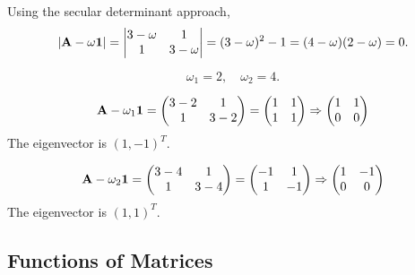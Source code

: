 \documentclass[a4paper]{book}
\newcounter{solution}[chapter]
\newcommand{\A}{{\bf A}}
\newcommand{\I}{{\bf 1}}
\begin{document}
	\begin{solution}
	
	Using the secular determinant approach,
	\begin{align*}
		| \A - \omega \I | = \begin{vmatrix}
			3 - \omega & 1 \\ 1 & 3 - \omega 
		\end{vmatrix} = ( 3 - \omega )^2 - 1 = ( 4 - \omega ) ( 2 - \omega ) = 0.
	\end{align*}
	
	\[
		\omega_1 = 2 , \quad \omega_2 = 4.
	\]
	
	\[
		\A - \omega_1 \I = \begin{pmatrix}
			3 - 2 & 1 \\ 1 & 3 - 2
		\end{pmatrix} = \begin{pmatrix}
			1 & 1 \\ 1 & 1
		\end{pmatrix} \Rightarrow \begin{pmatrix}
			1 & 1 \\ 0 & 0
		\end{pmatrix}
	\]
	The eigenvector is $(1,-1)^T$.
	
		\[
		\A - \omega_2 \I = \begin{pmatrix}
			3 - 4 & 1 \\ 1 & 3 - 4
		\end{pmatrix} = \begin{pmatrix}
			-1 & 1 \\ 1 & -1
		\end{pmatrix} \Rightarrow \begin{pmatrix}
			1 & -1 \\ 0 & 0
		\end{pmatrix}
	\]
	The eigenvector is $(1,1)^T$.
	\end{solution}

	\subsection{Functions of Matrices}
	
\end{document}
